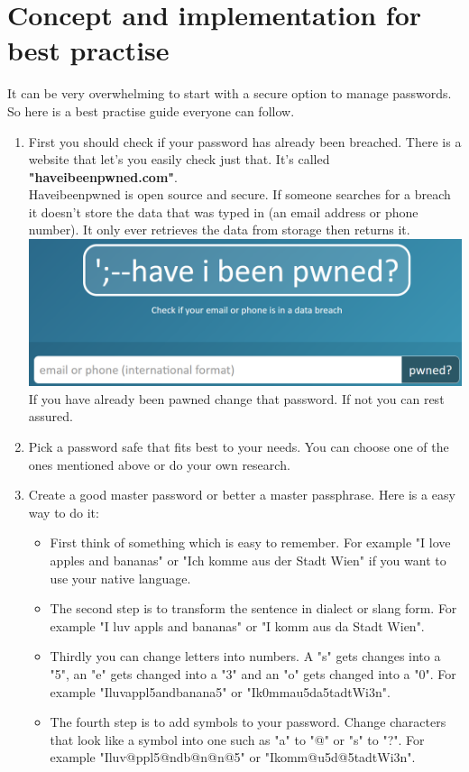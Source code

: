 \documentclass[conference]{IEEEtran}
\begin{document}
\section{Concept and implementation for best practise}
It can be very overwhelming to start with a secure option to manage passwords. So here is a best practise guide everyone can follow.
\begin{enumerate}
\item First you should check if your password has already been breached. There is a website that let's you easily check just that. It's called \textbf{"haveibeenpwned.com"}.\\
Haveibeenpwned is open source and secure. If someone searches for a breach it doesn't store the data that was typed in (an email address or phone number). It only ever retrieves the data from storage then returns it. \vspace{0.5cm}
\includegraphics[scale=0.32]{./images/haveibeenpwned.png}\\
If you have already been pawned change that password. If not you can rest assured. 
\item Pick a password safe that fits best to your needs. You can choose one of the ones mentioned above or do your own research.
\item Create a good master password or better a master passphrase. Here is a easy way to do it: 
\begin{itemize}
\item First think of something which is easy to remember. For example "I love apples and bananas" or "Ich komme aus der Stadt Wien" if you want to use your native language.
\item The second step is to transform the sentence in dialect or slang form. For example "I luv appls and bananas" or "I komm aus da Stadt Wien".
\item Thirdly you can change letters into numbers. A "s" gets changes into a "5", an "e" gets changed into a "3" and an "o" gets changed into a "0". For example "Iluvappl5andbanana5" or "Ik0mmau5da5tadtWi3n".
\item The fourth step is to add symbols to your password. Change characters that look like a symbol into one such as "a" to "@" or "s" to "?". For example "Iluv@ppl5@ndb@n@n@5" or "Ikomm@u5d@5tadtWi3n".

\end{itemize}
\end{enumerate}
\end{document}
